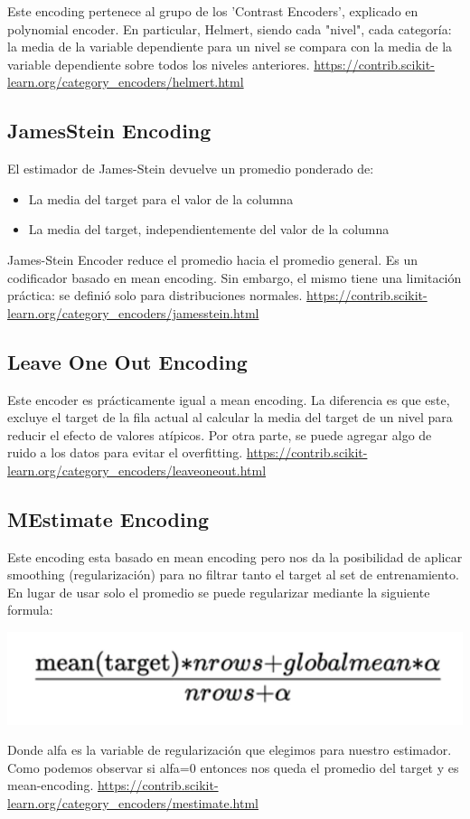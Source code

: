 \documentclass[12pt,a4paper]{article}
\begin{document}
Este encoding pertenece al grupo de los 'Contrast Encoders', explicado en polynomial encoder.
En particular, Helmert, siendo cada "nivel", cada categoría: la media de la variable dependiente para un nivel se compara con la media de la variable dependiente sobre todos los niveles anteriores.
\url{https://contrib.scikit-learn.org/category_encoders/helmert.html}

\subsection{JamesStein Encoding}
El estimador de James-Stein devuelve un promedio ponderado de:
\begin{itemize}
    \item La media del target para el valor de la columna 
    \item La media del target, independientemente del valor de la columna
\end{itemize}
James-Stein Encoder reduce el promedio hacia el promedio general. Es un codificador basado en mean encoding. Sin embargo, el mismo tiene una limitación práctica: se definió solo para distribuciones normales.
\url{https://contrib.scikit-learn.org/category_encoders/jamesstein.html}

\subsection{Leave One Out Encoding}
Este encoder es prácticamente igual a mean encoding. La diferencia es que este, excluye el target de la fila actual al calcular la media del target de un nivel para reducir el efecto de valores atípicos. \newline
Por otra parte, se puede agregar algo de ruido a los datos para evitar el overfitting. 
\url{https://contrib.scikit-learn.org/category_encoders/leaveoneout.html}

\subsection{MEstimate Encoding}
Este encoding esta basado en mean encoding pero nos da la posibilidad de aplicar smoothing (regularización) para no filtrar tanto el target al set de entrenamiento. En lugar de usar solo el promedio se puede regularizar mediante la siguiente formula:
\begin{center}
    \includegraphics[scale=0.5]{imgs/formula-smoothing.png}
\end{center}
Donde alfa es la variable de regularización que elegimos para nuestro estimador. Como podemos observar si alfa=0 entonces nos queda el promedio del target y es mean-encoding.
\url{https://contrib.scikit-learn.org/category_encoders/mestimate.html}
\end{document}
